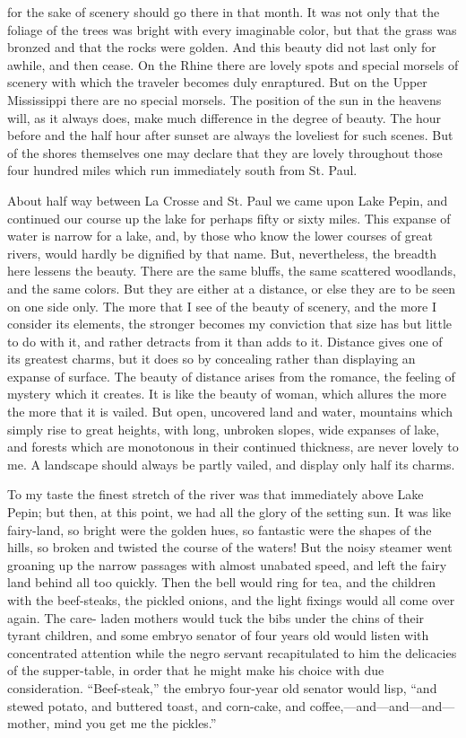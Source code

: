for the sake of scenery should go there in that month.  It was not
only that the foliage of the trees was bright with every imaginable
color, but that the grass was bronzed and that the rocks were
golden.  And this beauty did not last only for awhile, and then
cease.  On the Rhine there are lovely spots and special morsels of
scenery with which the traveler becomes duly enraptured.  But on
the Upper Mississippi there are no special morsels.  The position
of the sun in the heavens will, as it always does, make much
difference in the degree of beauty.  The hour before and the half
hour after sunset are always the loveliest for such scenes.  But of
the shores themselves one may declare that they are lovely
throughout those four hundred miles which run immediately south
from St. Paul.

About half way between La Crosse and St. Paul we came upon Lake
Pepin, and continued our course up the lake for perhaps fifty or
sixty miles.  This expanse of water is narrow for a lake, and, by
those who know the lower courses of great rivers, would hardly be
dignified by that name.  But, nevertheless, the breadth here
lessens the beauty.  There are the same bluffs, the same scattered
woodlands, and the same colors.  But they are either at a distance,
or else they are to be seen on one side only.  The more that I see
of the beauty of scenery, and the more I consider its elements, the
stronger becomes my conviction that size has but little to do with
it, and rather detracts from it than adds to it.  Distance gives
one of its greatest charms, but it does so by concealing rather
than displaying an expanse of surface.  The beauty of distance
arises from the romance, the feeling of mystery which it creates.
It is like the beauty of woman, which allures the more the more
that it is vailed.  But open, uncovered land and water, mountains
which simply rise to great heights, with long, unbroken slopes,
wide expanses of lake, and forests which are monotonous in their
continued thickness, are never lovely to me.  A landscape should
always be partly vailed, and display only half its charms.

To my taste the finest stretch of the river was that immediately
above Lake Pepin; but then, at this point, we had all the glory of
the setting sun.  It was like fairy-land, so bright were the golden
hues, so fantastic were the shapes of the hills, so broken and
twisted the course of the waters!  But the noisy steamer went
groaning up the narrow passages with almost unabated speed, and
left the fairy land behind all too quickly.  Then the bell would
ring for tea, and the children with the beef-steaks, the pickled
onions, and the light fixings would all come over again.  The care-
laden mothers would tuck the bibs under the chins of their tyrant
children, and some embryo senator of four years old would listen
with concentrated attention while the negro servant recapitulated
to him the delicacies of the supper-table, in order that he might
make his choice with due consideration.  ``Beef-steak,'' the embryo
four-year old senator would lisp, ``and stewed potato, and buttered
toast, and corn-cake, and coffee,---and---and---and---mother, mind you
get me the pickles.''

